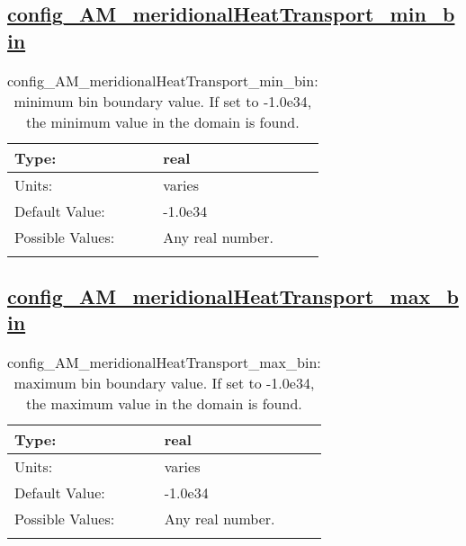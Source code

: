 \subsection[config\_AM\_meridionalHeatTransport\_min\_bin]{\hyperref[sec:nm_tab_AM_meridionalHeatTransport]{config\_AM\_meridionalHeatTransport\_min\_bin}}
\label{subsec:nm_sec_config_AM_meridionalHeatTransport_min_bin}
\begin{center}
\begin{longtable}{| p{2.0in} || p{4.0in} |}
    \hline
    Type: & real \\
    \hline
    Units: & \si{varies} \\
    \hline
    Default Value: & -1.0e34 \\
    \hline
    Possible Values: & Any real number. \\
    \hline
    \caption{config\_AM\_meridionalHeatTransport\_min\_bin: minimum bin boundary value.  If set to -1.0e34, the minimum value in the domain is found.}
\end{longtable}
\end{center}
\subsection[config\_AM\_meridionalHeatTransport\_max\_bin]{\hyperref[sec:nm_tab_AM_meridionalHeatTransport]{config\_AM\_meridionalHeatTransport\_max\_bin}}
\label{subsec:nm_sec_config_AM_meridionalHeatTransport_max_bin}
\begin{center}
\begin{longtable}{| p{2.0in} || p{4.0in} |}
    \hline
    Type: & real \\
    \hline
    Units: & \si{varies} \\
    \hline
    Default Value: & -1.0e34 \\
    \hline
    Possible Values: & Any real number. \\
    \hline
    \caption{config\_AM\_meridionalHeatTransport\_max\_bin: maximum bin boundary value.  If set to -1.0e34, the maximum value in the domain is found.}
\end{longtable}
\end{center}
